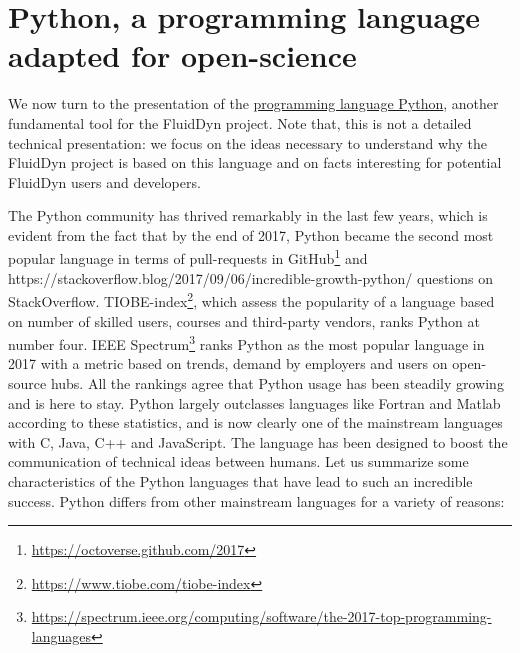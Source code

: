 \section{Python, a programming language adapted for open-science}

We now turn to the presentation of the
\href{https://www.python.org/}{programming language Python}, another
fundamental tool for the FluidDyn project. Note that, this is not a detailed
technical presentation: we focus on the ideas necessary to understand why the
FluidDyn project is based on this language and on facts interesting for
potential FluidDyn users and developers.

The Python community has thrived remarkably in the last few years, which is
evident from the fact that by the end of 2017, Python became the second most
popular language in terms of pull-requests in GitHub\footnote{%
\url{https://octoverse.github.com/2017}
%
} and
\fnref%
{https://stackoverflow.blog/2017/09/06/incredible-growth-python/}%
{questions on StackOverflow}.
%
TIOBE-index\footnote{\url{https://www.tiobe.com/tiobe-index}}, which assess the
popularity of a language based on number of skilled users, courses and
third-party vendors, ranks Python at number four. IEEE Spectrum\footnote{
\url{https://spectrum.ieee.org/computing/software/the-2017-top-programming-languages}
}
ranks Python as the most popular language in 2017 with a metric
based on trends, demand by employers and users on open-source hubs.  All the
rankings agree that Python usage has been steadily growing and is here to stay.
Python largely outclasses languages like Fortran and Matlab according to these
statistics, and is now clearly one of the mainstream languages with C, Java,
C++ and JavaScript.
%
The language has been designed to boost the communication of technical ideas
between humans.
%
Let us summarize some characteristics of the Python languages that have lead to
such an incredible success.
%
Python differs from other mainstream languages for a variety of reasons:


